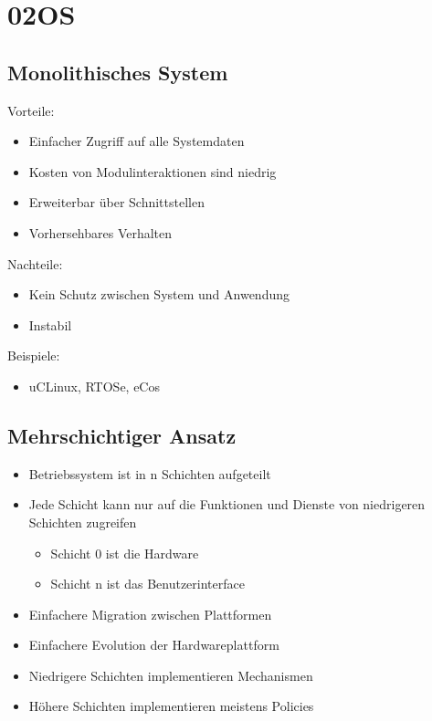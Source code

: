 \documentclass[a4paper]{scrreprt}
\begin{document}
\chapter{02OS}

\section{Monolithisches System}
Vorteile:
	\begin{itemize} 
		\item Einfacher Zugriff auf alle Systemdaten 
		\item Kosten von Modulinteraktionen sind niedrig
		\item Erweiterbar über Schnittstellen
		\item Vorhersehbares Verhalten 
	\end{itemize}
Nachteile:
	\begin{itemize}
		\item Kein Schutz zwischen System und Anwendung
		\item Instabil
	\end{itemize}

Beispiele:
	\begin{itemize}
		\item uCLinux, RTOSe, eCos
	\end{itemize}
	
\section{Mehrschichtiger Ansatz}
	\begin{itemize}
		\item Betriebssystem ist in n Schichten aufgeteilt
		\item Jede Schicht kann nur auf die Funktionen und Dienste von niedrigeren Schichten zugreifen 
			\begin{itemize} 
				\item Schicht 0 ist die Hardware
				\item Schicht n ist das Benutzerinterface
			\end{itemize}
		\item Einfachere Migration zwischen Plattformen
		\item Einfachere Evolution der Hardwareplattform
		\item Niedrigere Schichten implementieren Mechanismen
		\item Höhere Schichten implementieren meistens Policies
	\end{itemize}
\end{document}
